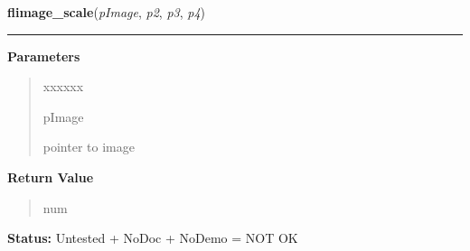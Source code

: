 \hspace{.8\funcindent}\begin{boxedminipage}{\funcwidth}

    \raggedright \textbf{flimage\_scale}(\textit{pImage}, \textit{p2}, \textit{p3}, \textit{p4})

    \vspace{-1.5ex}

    \rule{\textwidth}{0.5\fboxrule}
\setlength{\parskip}{2ex}
\setlength{\parskip}{1ex}
      \textbf{Parameters}
      \vspace{-1ex}

      \begin{quote}
        \begin{Ventry}{xxxxxx}

          \item[pImage]

          pointer to image

        \end{Ventry}

      \end{quote}

      \textbf{Return Value}
    \vspace{-1ex}

      \begin{quote}
      num

      \end{quote}

\textbf{Status:} Untested + NoDoc + NoDemo = NOT OK



    \end{boxedminipage}

    \label{xformslib:flflimage:flimage_warp}

    \vspace{0.5ex}

